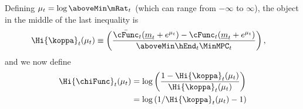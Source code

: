   Defining $\mu_{t} =
  \log \aboveMin \mRat_{t}$ (which can range from $-\infty$ to $\infty$), the object in the middle of the last inequality is
  \begin{equation}\begin{gathered}\begin{aligned}
    \Hi{\koppa}_{t}(\mu_{t})   & \equiv  \left(\frac{\bar{\cFunc}_{t}(\ushort{m}_{t}+e^{\mu_{t}})-\cFunc_{t}(\ushort{m}_{t}+e^{\mu_{t}})}{\aboveMin \hEnd_{t} \MinMPC_{t}}\right), \label{eq:koppa}
  \end{aligned}\end{gathered}\end{equation}
  and we now define
  \begin{equation}\begin{gathered}\begin{aligned}
    \Hi{\chiFunc}_{t}(\mu_{t})  & = \log \left(\frac{1-\Hi{\koppa}_{t}(\mu_{t})}{\Hi{\koppa}_{t}(\mu_{t})}\right)
    \\  & = \log \left(1/\Hi{\koppa}_{t}(\mu_{t})-1\right) \label{eq:chi}
  \end{aligned}\end{gathered}\end{equation}
